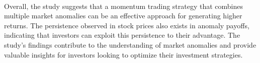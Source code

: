 \documentclass{article}
\begin{document}
\\
Overall, the study suggests that a momentum trading strategy that combines multiple market anomalies can be an effective approach for generating higher returns. The persistence observed in stock prices also exists in anomaly payoffs, indicating that investors can exploit this persistence to their advantage. The study's findings contribute to the understanding of market anomalies and provide valuable insights for investors looking to optimize their investment strategies. 
\end{document}
